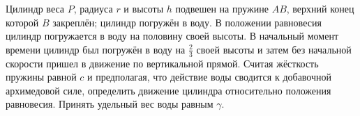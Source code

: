 Цилиндр веса $P$, радиуса $r$ и высоты $h$ подвешен на пружине $AB$, верхний конец которой $B$ закреплён;
цилиндр погружён в воду. В положении равновесия цилиндр погружается в воду на половину своей высоты.
В начальный момент времени цилиндр был погружён в воду на $\frac{2}{3}$ своей высоты и затем без начальной
скорости пришел в движение по вертикальной прямой. Считая жёсткость пружины равной $c$ и предполагая, 
что действие воды сводится к добавочной архимедовой силе, определить движение цилиндра относительно положения
равновесия. Принять удельный вес воды равным $\gamma$.
